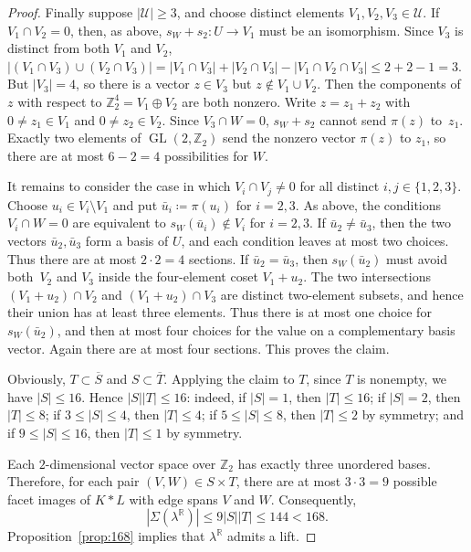 \documentclass{amsart}
\newcommand{\Z}{\mathbb{Z}}
\newcommand{\R}{\mathbb{R}}
\newcommand{\cU}{\mathcal{U}}
\DeclareMathOperator{\GL}{GL}
\theoremstyle{definition}
\theoremstyle{remark}
\begin{document}
\begin{proof}
    Finally suppose $|\cU|\ge3$, and choose distinct elements $V_1,V_2,V_3\in\cU$.
    If $V_1\cap V_2=0$, then, as above, $s_W+s_2\colon U\to V_1$ must be an isomorphism.
    Since $V_3$ is distinct from both $V_1$ and $V_2$, $|(V_1\cap V_3)\cup (V_2\cap V_3)| = |V_1\cap V_3| + |V_2\cap V_3| - |V_1\cap V_2\cap V_3|\leq 2+2-1 = 3$. But $|V_3| = 4$, so there is a vector $z\in V_3$ but $z\notin V_1\cup V_2$. Then the components of $z$ with respect to $\Z_2^4=V_1\oplus V_2$ are both nonzero.
    Write $z=z_1+z_2$ with $0\ne z_1\in V_1$ and $0\ne z_2\in V_2$.
    Since $V_3\cap W=0$, $s_W+s_2$ cannot send $\pi(z)$ to~$z_1$.
    Exactly two elements of $\GL(2,\Z_2)$ send the nonzero vector $\pi(z)$ to $z_1$, so there are at most $6-2=4$ possibilities for $W$.

    It remains to consider the case in which $V_i\cap V_j\ne0$ for all distinct $i,j\in\{1,2,3\}$.
    Choose $u_i\in V_i\setminus V_1$ and put $\bar u_i\coloneq\pi(u_i)$ for $i=2,3$.
    As above, the conditions $V_i\cap W=0$ are equivalent to $s_W(\bar u_i)\notin V_i$ for $i=2,3$.
    If $\bar u_2\ne\bar u_3$, then the two vectors $\bar u_2,\bar u_3$ form a basis of $U$, and each condition leaves at most two choices.
    Thus there are at most $2\cdot2=4$ sections.
    If $\bar u_2=\bar u_3$, then $s_W(\bar u_2)$ must avoid both~$V_2$ and $V_3$ inside the four-element coset $V_1+u_2$.
    The two intersections $(V_1+u_2)\cap V_2$ and $(V_1+u_2)\cap V_3$ are distinct two-element subsets, and hence their union has at least three elements.
    Thus there is at most one choice for $s_W(\bar u_2)$, and then at most four choices for the value on a complementary basis vector.
    Again there are at most four sections.
    This proves the claim.

    Obviously, $T\subset\overline S$ and $S\subset\overline T$.
    Applying the claim to $T$, since $T$ is nonempty, we have $|S|\le16$.
    Hence $|S||T|\le16$: indeed, if $|S|=1$, then $|T|\le16$; if $|S|=2$, then $|T|\le8$; if $3\le |S|\le4$, then $|T|\le4$; if $5\le |S|\le8$, then $|T|\le2$ by symmetry; and if $9\le |S|\le16$, then $|T|\le1$ by symmetry.

    Each $2$-dimensional vector space over $\Z_2$ has exactly three unordered bases.
    Therefore, for each pair $(V,W)\in S\times T$, there are at most $3\cdot3=9$ possible facet images of $K\ast L$ with edge spans $V$ and $W$.
    Consequently,
    $$
        |\Sigma(\lambda^\R)|\le 9|S||T|\le 144<168.
    $$
    Proposition~\ref{prop:168} implies that $\lambda^\R$ admits a lift.
\end{proof}
\end{document}
